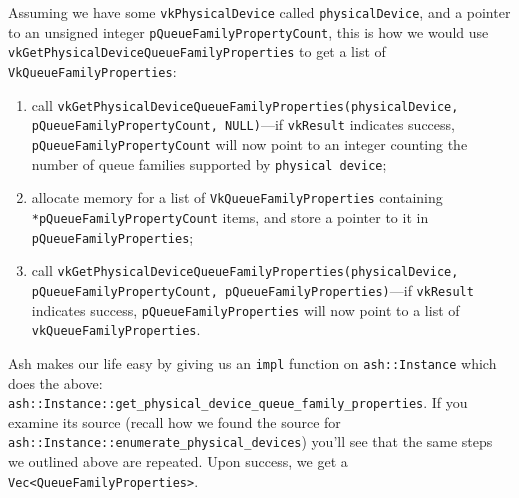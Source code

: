 \documentclass[12pt,letterpaper]{article}
\newcommand{\ril}[1]{\texttt{#1}}
\newcommand{\cil}[1]{\texttt{#1}}
\begin{document}
Assuming we have some \cil{vkPhysicalDevice} called \cil{physicalDevice}, and a pointer to an unsigned integer \cil{pQueueFamilyPropertyCount}, this is how we would use \cil{vkGetPhysicalDeviceQueueFamilyProperties} to get a list of \cil{VkQueueFamilyProperties}:
	\begin{enumerate}
		\item call \cil{vkGetPhysicalDeviceQueueFamilyProperties(physicalDevice, pQueueFamilyPropertyCount, NULL)}---if \cil{vkResult} indicates success, \cil{pQueueFamilyPropertyCount} will now point to an integer counting the number of queue families supported by \cil{physical device};
		
		\item allocate memory for a list of \cil{VkQueueFamilyProperties} containing \cil{*pQueueFamilyPropertyCount} items, and store a pointer to it in \cil{pQueueFamilyProperties};
		
		\item call \cil{vkGetPhysicalDeviceQueueFamilyProperties(physicalDevice, pQueueFamilyPropertyCount, pQueueFamilyProperties)}---if \cil{vkResult} indicates success, \cil{pQueueFamilyProperties} will now point to a list of \cil{vkQueueFamilyProperties}.
	\end{enumerate}

	Ash makes our life easy by giving us an \ril{impl} function on \ril{ash::Instance} which does the above: \ril{ash::Instance::get_physical_device_queue_family_properties}. If you examine its source (recall how we found the source for \ril{ash::Instance::enumerate_physical_devices}) you'll see that the same steps we outlined above are repeated. Upon success, we get a \ril{Vec<QueueFamilyProperties>}. 
	
	
	
\end{document}
